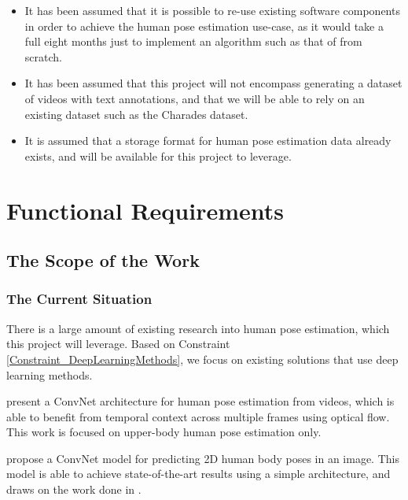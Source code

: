 \documentclass{scrreprt}
\begin{document}
\begin{itemize}
        \item It has been assumed that it is possible to re-use existing
                software components in order to achieve the human pose
                estimation use-case, as it would take a full eight months just
                to implement an algorithm such as that of
                \cite{DBLP:journals/corr/PfisterCZ15} from scratch.
        \item It has been assumed that this project will not encompass
                generating a dataset of videos with text annotations, and that
                we will be able to rely on an existing dataset such as the
                Charades dataset.
        \item It is assumed that a storage format for human pose estimation
                data already exists, and will be available for this project to
                leverage.
\end{itemize}

\chapter{Functional Requirements}

\section{The Scope of the Work}

\subsection{The Current Situation}

There is a large amount of existing research into human pose estimation, which
this project will leverage. Based on Constraint
\ref{Constraint_DeepLearningMethods}, we focus on existing solutions that use
deep learning methods.

\cite{DBLP:journals/corr/PfisterCZ15} present a ConvNet architecture for human
pose estimation from videos, which is able to benefit from temporal context
across multiple frames using optical flow. This work is focused on upper-body
human pose estimation only.

\cite{DBLP:journals/corr/BelagiannisZ16} propose a ConvNet model for predicting
2D human body poses in an image. This model is able to achieve state-of-the-art
results using a simple architecture, and draws on the work done in
\cite{DBLP:journals/corr/PfisterCZ15}.
\end{document}
